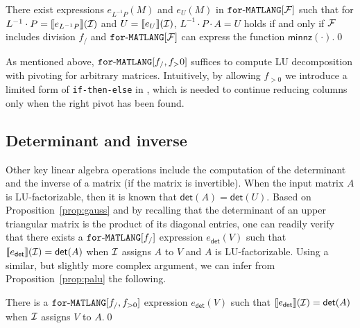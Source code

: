  \begin{proposition}\label{prop:palu}
There exist expressions $e_{L^{-1}P}(M)$ and $e_U(M)$ in $\texttt{for}\text{-}\texttt{MATLANG}[\mathcal{F}]$  such that for
$L^{-1}\cdot P=\llbracket e_{L^{-1}P} \rrbracket(\mathcal{I})$ and $U=\llbracket e_U \rrbracket(\mathcal{I})$, $L^{-1}\cdot P\cdot A=U$ holds
if and only if $\mathcal{F}$ includes division $f_/$ and $\texttt{for}\text{-}\texttt{MATLANG}[\mathcal{F}]$ can express the function $\mathsf{minnz}(\cdot)$.\qed
\end{proposition}
As mentioned above, $\texttt{for}\text{-}\texttt{MATLANG}[f_/,f_>0]$ suffices to compute LU decomposition with pivoting for arbitrary matrices.
Intuitively, by allowing $f_{>0}$ we introduce a limited form of \texttt{if-then-else} in \langfor, which is needed
to continue reducing columns only when the right pivot has been found.

\subsection{Determinant and inverse}
Other key linear algebra operations include the computation of the determinant and
the inverse of a matrix (if the matrix is invertible). When the input matrix
$A$ is LU-factorizable, then it is known that $\mathsf{det}(A)=\mathsf{det}(U)$.
Based on Proposition~\ref{prop:gauss}
and by recalling that the determinant of an upper triangular matrix is the product
of its diagonal entries, one can readily verify that there exists a $\texttt{for}\text{-}\texttt{MATLANG}[f_/]$
expression $e_{\mathsf{det}}(V)$ such that $\llbracket e_{\mathsf{det}} \rrbracket(\mathcal{I})=\mathsf{det}(A)$
when $\mathcal{I}$ assigns $A$ to $V$ and $A$ is LU-factorizable. Using a similar, but slightly
more complex argument, we can infer from Proposition~\ref{prop:palu} the following.
 \begin{proposition}\label{prop:determinant}
There is a $\texttt{for}\text{-}\texttt{MATLANG}[f_/,f_{>0}]$ expression $e_{\mathsf{det}}(V)$ such 
that $\llbracket e_{\mathsf{det}} \rrbracket(\mathcal{I})=\mathsf{det}(A)$ when $\mathcal{I}$ assigns $V$
to $A$.\qed
\end{proposition}

